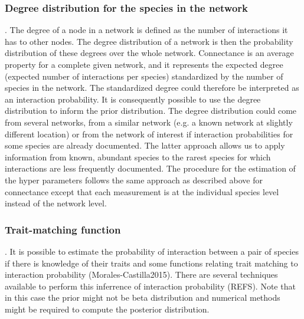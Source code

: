 \documentclass[12pt]{article}
\begin{document}
  \subsubsection*{Degree distribution for the species in the network}.
%
The degree of a node in a network is defined as the number of interactions it has to other nodes. The degree distribution of a network is then the probability distribution of these degrees over the whole network. Connectance is an average property for a complete given network, and it represents the expected
degree (expected number of interactions per species) standardized by the number of species in the network. The standardized degree could therefore be interpreted as an interaction probability. It is consequently possible to
use the degree distribution to inform the prior distribution. The degree distribution could
come from several networks, from a similar network (e.g. a known network at slightly different location) or from the network of interest if interaction probabilities for some species are already documented. The latter approach allows us to apply information from known, abundant species to the rarest species for which interactions are less
frequently documented. The procedure for the estimation of the hyper parameters follows
the same approach as described above for connectance except that each
measurement is at the individual species level instead of the network level.

  \subsubsection*{Trait-matching function}. 
  It is possible to estimate the probability of interaction between a pair of species if there is knowledge of their traits and some functions relating trait matching to interaction probability (Morales-Castilla2015). There are several techniques available to perform this inferrence of interaction probability (REFS). Note that in this case the prior might not be beta distribution and numerical methods might be required to compute the posterior distribution.  
\end{document}
